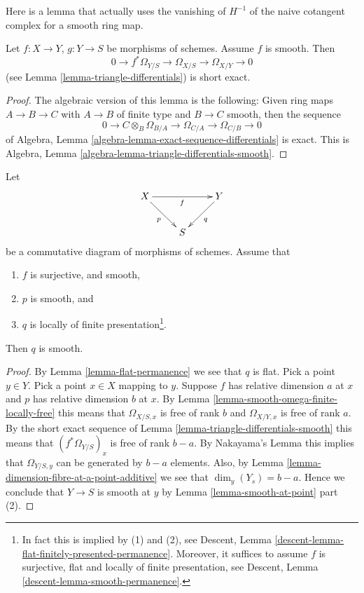 \noindent
Here is a lemma that actually uses the vanishing of $H^{-1}$
of the naive cotangent complex for a smooth ring map.

\begin{lemma}
\label{lemma-triangle-differentials-smooth}
Let $f : X \to Y$, $g : Y \to S$ be morphisms of schemes.
Assume $f$ is smooth. Then
$$
0 \to f^*\Omega_{Y/S} \to \Omega_{X/S} \to \Omega_{X/Y} \to 0
$$
(see Lemma \ref{lemma-triangle-differentials}) is short exact.
\end{lemma}

\begin{proof}
The algebraic version of this lemma is the following:
Given ring maps $A \to B \to C$ with $A \to B$ of finite
type and $B \to C$ smooth, then the sequence
$$
0 \to C \otimes_B \Omega_{B/A} \to \Omega_{C/A} \to \Omega_{C/B} \to 0
$$
of Algebra, Lemma \ref{algebra-lemma-exact-sequence-differentials} is exact.
This is
Algebra, Lemma \ref{algebra-lemma-triangle-differentials-smooth}.
\end{proof}

\begin{lemma}
\label{lemma-smooth-permanence}
Let
$$
\xymatrix{
X \ar[rr]_f \ar[rd]_p & &
Y \ar[dl]^q \\
& S
}
$$
be a commutative diagram of morphisms of schemes. Assume that
\begin{enumerate}
\item $f$ is surjective, and smooth,
\item $p$ is smooth, and
\item $q$ is locally of finite presentation\footnote{In fact this
is implied by (1) and (2), see
Descent, Lemma \ref{descent-lemma-flat-finitely-presented-permanence}.
Moreover, it suffices to assume $f$ is surjective, flat and locally
of finite presentation, see
Descent, Lemma \ref{descent-lemma-smooth-permanence}.}.
\end{enumerate}
Then $q$ is smooth.
\end{lemma}

\begin{proof}
By Lemma \ref{lemma-flat-permanence} we see that $q$ is flat.
Pick a point $y \in Y$. Pick a point $x \in X$ mapping to $y$.
Suppose $f$ has relative dimension $a$ at $x$ and $p$ has relative
dimension $b$ at $x$. By Lemma \ref{lemma-smooth-omega-finite-locally-free}
this means that $\Omega_{X/S, x}$ is free of rank $b$ and $\Omega_{X/Y, x}$
is free of rank $a$. By the short exact sequence
of Lemma \ref{lemma-triangle-differentials-smooth}
this means that $(f^*\Omega_{Y/S})_x$ is free
of rank $b - a$. By Nakayama's Lemma this implies that
$\Omega_{Y/S, y}$ can be generated by $b - a$ elements.
Also, by Lemma \ref{lemma-dimension-fibre-at-a-point-additive} we see that
$\dim_y(Y_s) = b - a$. Hence we conclude that
$Y \to S$ is smooth at $y$ by Lemma \ref{lemma-smooth-at-point} part (2).
\end{proof}

